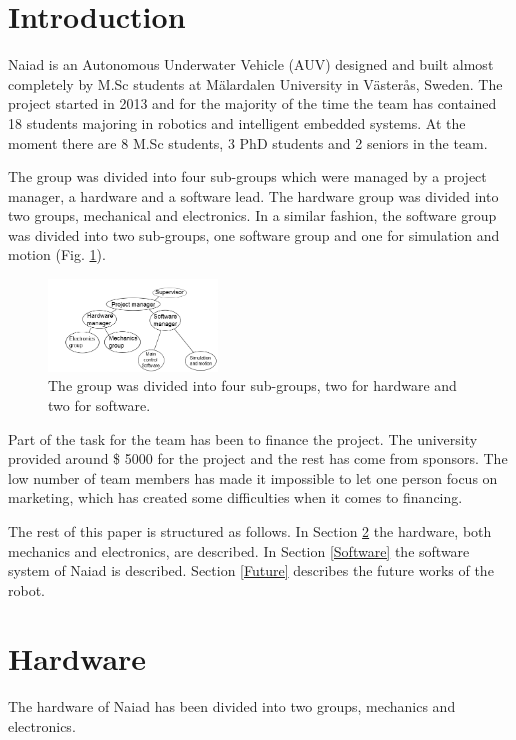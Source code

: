 \documentclass[twoside,12pt]{article}
\begin{document}
\begin{multicols*}{2}
\section{Introduction}
Naiad is an Autonomous Underwater Vehicle (AUV) designed and built almost completely by M.Sc students at M\"{a}lardalen University in V\"{a}ster\aa s, Sweden. The project started in 2013 and for the majority of the time the team has contained 18 students majoring in robotics and intelligent embedded systems. At the moment there are 8 M.Sc students, 3 PhD students and 2 seniors in the team. 

The group was divided into four sub-groups which were managed by a project manager, a hardware and a software lead. The hardware group was divided into two groups, mechanical and electronics. In a similar fashion, the software group was divided into two sub-groups, one software group and one for simulation and motion (Fig. \ref{hierarchy}).
\begin{figure}[H]
\begin{center}
\includegraphics[width=0.4\textwidth]{./images/hierarchy.png}
\caption{The group was divided into four sub-groups, two for hardware and two for software.}
\label{hierarchy}
\end{center}
\end{figure}

Part of the task for the team has been to finance the project. The university provided around \$ 5000 for the project and the rest has come from sponsors. The low number of team members has made it impossible to let one person focus on marketing, which has created some difficulties when it comes to financing. 

The rest of this paper is structured as follows. In Section \ref{Hardware} the hardware, both mechanics and electronics, are described. In Section \ref{Software} the software system of Naiad is described. Section \ref{Future} describes the future works of the robot. 
\section{Hardware}
\label{Hardware}
The hardware of Naiad has been divided into two groups, mechanics and electronics. 

\end{multicols*}
\end{document}
